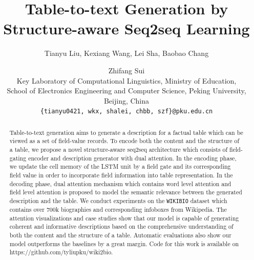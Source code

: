 \documentclass[letterpaper]{article} %
\begin{document}
%

\title{Table-to-text Generation by Structure-aware Seq2seq Learning}

\author{Tianyu Liu, Kexiang Wang, Lei Sha, Baobao Chang \and Zhifang Sui \\
Key Laboratory of Computational Linguistics, Ministry of Education, \\School of Electronics Engineering and Computer Science, Peking University, Beijing, China\\
  {\tt \{tianyu0421, wkx, shalei, chbb, szf\}@pku.edu.cn}}
\maketitle
\begin{abstract}

Table-to-text generation aims to generate a description for a factual table which can be viewed as a set of field-value records.
To encode both the content and the structure of a table,
we propose a novel structure-aware seq2seq architecture 
which consists of field-gating encoder and description generator with dual attention. 
In the encoding phase, we update the cell memory of the LSTM unit by a field gate and its corresponding field value 
in order to incorporate field information into table representation.
In the decoding phase, dual attention mechanism which contains word level attention and field level attention is proposed 
to model the semantic relevance between the generated description and the table.
We conduct experiments on the \texttt{WIKIBIO} dataset which contains over 700k biographies and corresponding infoboxes from Wikipedia. 
The attention visualizations and case studies show that our model is capable of generating coherent and informative descriptions based on the comprehensive understanding of both the content and the structure of a table.
Automatic evaluations also show our model outperforms the baselines by a great margin. Code for this work is available on 
https://github.com/tyliupku/wiki2bio.
\end{abstract}
\end{document}
